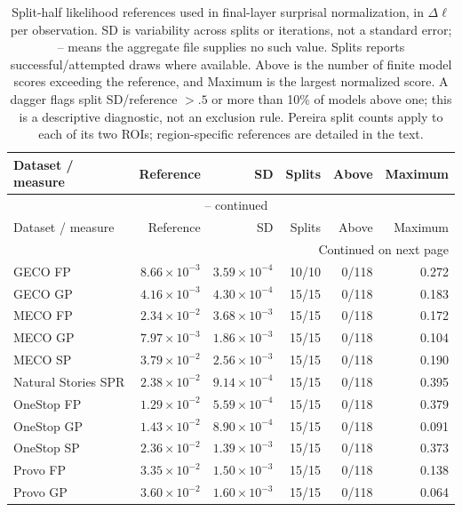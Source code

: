 {\small\setlength{\tabcolsep}{4pt}
\begin{longtable}{@{}lrrrrr@{}}
\caption{Split-half likelihood references used in final-layer surprisal normalization, in $\Delta\ell$ per observation. SD is variability across splits or iterations, not a standard error; -- means the aggregate file supplies no such value. Splits reports successful/attempted draws where available. Above is the number of finite model scores exceeding the reference, and Maximum is the largest normalized score. A dagger flags split SD/reference $>.5$ or more than 10\% of models above one; this is a descriptive diagnostic, not an exclusion rule. Pereira split counts apply to each of its two ROIs; region-specific references are detailed in the text.}\label{tab:dll-ceilings} \\
\toprule
Dataset / measure & Reference & SD & Splits & Above & Maximum \\
\midrule
\endfirsthead
\multicolumn{6}{c}{\tablename\ \thetable{} -- continued} \\
\toprule
Dataset / measure & Reference & SD & Splits & Above & Maximum \\
\midrule
\endhead
\midrule\multicolumn{6}{r}{Continued on next page} \\
\endfoot
\bottomrule
\endlastfoot
GECO FP & $8.66\times10^{-3}$ & $3.59\times10^{-4}$ & 10/10 & 0/118 & 0.272 \\
GECO GP & $4.16\times10^{-3}$ & $4.30\times10^{-4}$ & 15/15 & 0/118 & 0.183 \\
MECO FP & $2.34\times10^{-2}$ & $3.68\times10^{-3}$ & 15/15 & 0/118 & 0.172 \\
MECO GP & $7.97\times10^{-3}$ & $1.86\times10^{-3}$ & 15/15 & 0/118 & 0.104 \\
MECO SP & $3.79\times10^{-2}$ & $2.56\times10^{-3}$ & 15/15 & 0/118 & 0.190 \\
Natural Stories SPR & $2.38\times10^{-2}$ & $9.14\times10^{-4}$ & 15/15 & 0/118 & 0.395 \\
OneStop FP & $1.29\times10^{-2}$ & $5.59\times10^{-4}$ & 15/15 & 0/118 & 0.379 \\
OneStop GP & $1.43\times10^{-2}$ & $8.90\times10^{-4}$ & 15/15 & 0/118 & 0.091 \\
OneStop SP & $2.36\times10^{-2}$ & $1.39\times10^{-3}$ & 15/15 & 0/118 & 0.373 \\
Provo FP & $3.35\times10^{-2}$ & $1.50\times10^{-3}$ & 15/15 & 0/118 & 0.138 \\
Provo GP & $3.60\times10^{-2}$ & $1.60\times10^{-3}$ & 15/15 & 0/118 & 0.064 \\

\end{longtable}}
